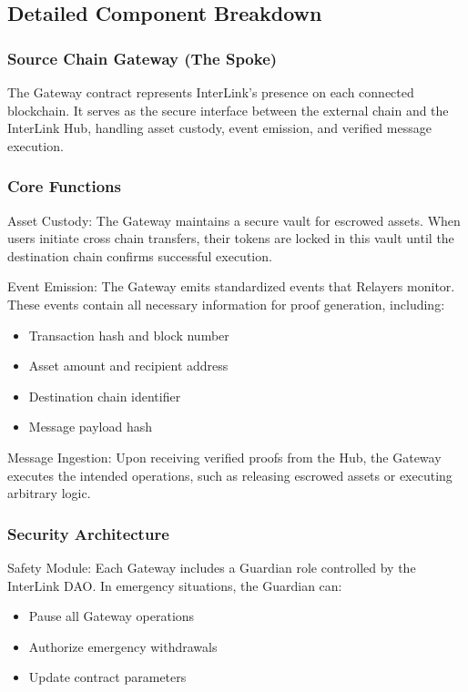 \documentclass[11pt,a4paper]{article}
\begin{document}
\subsection{Detailed Component Breakdown}

\subsubsection{Source Chain Gateway (The Spoke)}

The Gateway contract represents InterLink's presence on each connected blockchain. It serves as the secure interface between the external chain and the InterLink Hub, handling asset custody, event emission, and verified message execution.

\subsubsection*{Core Functions}

Asset Custody: The Gateway maintains a secure vault for escrowed assets. When users initiate cross chain transfers, their tokens are locked in this vault until the destination chain confirms successful execution.

Event Emission: The Gateway emits standardized events that Relayers monitor. These events contain all necessary information for proof generation, including:
\begin{itemize}
    \item Transaction hash and block number
    \item Asset amount and recipient address  
    \item Destination chain identifier
    \item Message payload hash
\end{itemize}

Message Ingestion: Upon receiving verified proofs from the Hub, the Gateway executes the intended operations, such as releasing escrowed assets or executing arbitrary logic.

\subsubsection*{Security Architecture}

Safety Module: Each Gateway includes a Guardian role controlled by the InterLink DAO. In emergency situations, the Guardian can:
\begin{itemize}
    \item Pause all Gateway operations
    \item Authorize emergency withdrawals
    \item Update contract parameters
\end{itemize}
\end{document}
